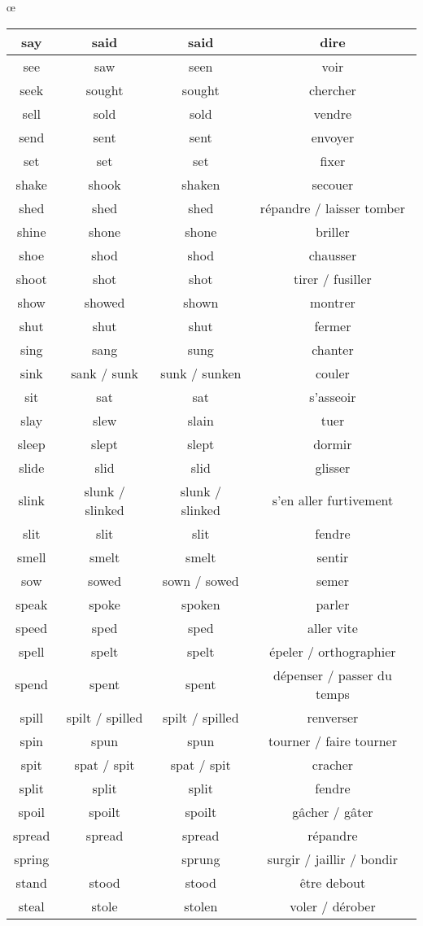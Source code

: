 œ\documentclass[a4paper,12pt,openany]{book}
\begin{document}
\newpage
\begin{tabular}{|c|c|c|c|}
\hline
say & said & said & dire\\
\hline
see & saw & seen & voir\\
\hline
seek & sought & sought & chercher\\
\hline
sell & sold & sold & vendre\\
\hline
send & sent & sent & envoyer\\
\hline
set & set & set & fixer\\
\hline
shake & shook & shaken & secouer\\
\hline
shed & shed & shed & répandre / laisser tomber\\
\hline
shine & shone & shone & briller\\
\hline
shoe & shod & shod & chausser\\
\hline
shoot & shot & shot & tirer / fusiller\\
\hline
show & showed & shown & montrer\\
\hline
shut & shut & shut & fermer\\
\hline
sing & sang & sung & chanter\\
\hline
sink & sank / sunk & sunk / sunken & couler\\
\hline
sit & sat & sat & s’asseoir\\
\hline
slay & slew & slain & tuer\\
\hline
sleep & slept & slept & dormir\\
\hline
slide & slid & slid & glisser\\
\hline
slink & slunk / slinked & slunk / slinked & s’en aller furtivement\\
\hline
slit & slit & slit & fendre\\
\hline
smell & smelt & smelt & sentir\\
\hline
sow & sowed & sown / sowed & semer\\
\hline
speak & spoke & spoken & parler\\
\hline
speed & sped & sped & aller vite\\
\hline
spell & spelt & spelt & épeler / orthographier\\
\hline
spend & spent & spent & dépenser / passer du temps\\
\hline
spill & spilt / spilled & spilt / spilled & renverser\\
\hline
spin & spun & spun & tourner / faire tourner\\
\hline
spit & spat / spit & spat / spit & cracher\\
\hline
split & split & split & fendre\\
\hline
spoil & spoilt & spoilt & gâcher / gâter\\
\hline
spread & spread & spread & répandre\\
\hline
spring &  & sprung & surgir / jaillir / bondir\\
\hline
stand & stood & stood & être debout\\
\hline
steal & stole & stolen & voler / dérober\\
\hline
\end{tabular}
\end{document}
